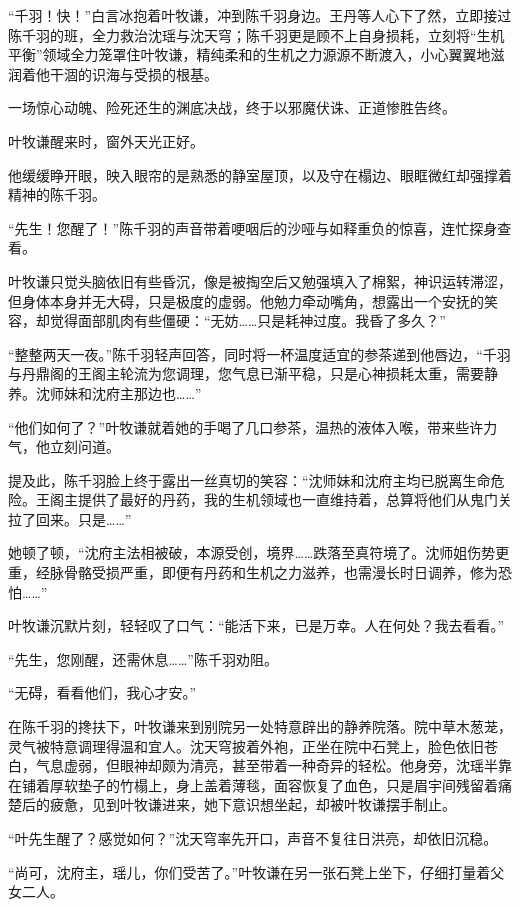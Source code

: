 “千羽！快！”白言冰抱着叶牧谦，冲到陈千羽身边。王丹等人心下了然，立即接过陈千羽的班，全力救治沈瑶与沈天穹；陈千羽更是顾不上自身损耗，立刻将“生机平衡”领域全力笼罩住叶牧谦，精纯柔和的生机之力源源不断渡入，小心翼翼地滋润着他干涸的识海与受损的根基。

一场惊心动魄、险死还生的渊底决战，终于以邪魔伏诛、正道惨胜告终。

\vspace{2em}

叶牧谦醒来时，窗外天光正好。

他缓缓睁开眼，映入眼帘的是熟悉的静室屋顶，以及守在榻边、眼眶微红却强撑着精神的陈千羽。

“先生！您醒了！”陈千羽的声音带着哽咽后的沙哑与如释重负的惊喜，连忙探身查看。

叶牧谦只觉头脑依旧有些昏沉，像是被掏空后又勉强填入了棉絮，神识运转滞涩，但身体本身并无大碍，只是极度的虚弱。他勉力牵动嘴角，想露出一个安抚的笑容，却觉得面部肌肉有些僵硬：“无妨……只是耗神过度。我昏了多久？”

“整整两天一夜。”陈千羽轻声回答，同时将一杯温度适宜的参茶递到他唇边，“千羽与丹鼎阁的王阁主轮流为您调理，您气息已渐平稳，只是心神损耗太重，需要静养。沈师妹和沈府主那边也……”

“他们如何了？”叶牧谦就着她的手喝了几口参茶，温热的液体入喉，带来些许力气，他立刻问道。

提及此，陈千羽脸上终于露出一丝真切的笑容：“沈师妹和沈府主均已脱离生命危险。王阁主提供了最好的丹药，我的生机领域也一直维持着，总算将他们从鬼门关拉了回来。只是……”

她顿了顿，“沈府主法相被破，本源受创，境界……跌落至真符境了。沈师姐伤势更重，经脉骨骼受损严重，即便有丹药和生机之力滋养，也需漫长时日调养，修为恐怕……”

叶牧谦沉默片刻，轻轻叹了口气：“能活下来，已是万幸。人在何处？我去看看。”

“先生，您刚醒，还需休息……”陈千羽劝阻。

“无碍，看看他们，我心才安。”

在陈千羽的搀扶下，叶牧谦来到别院另一处特意辟出的静养院落。院中草木葱茏，灵气被特意调理得温和宜人。沈天穹披着外袍，正坐在院中石凳上，脸色依旧苍白，气息虚弱，但眼神却颇为清亮，甚至带着一种奇异的轻松。他身旁，沈瑶半靠在铺着厚软垫子的竹榻上，身上盖着薄毯，面容恢复了血色，只是眉宇间残留着痛楚后的疲惫，见到叶牧谦进来，她下意识想坐起，却被叶牧谦摆手制止。

“叶先生醒了？感觉如何？”沈天穹率先开口，声音不复往日洪亮，却依旧沉稳。

“尚可，沈府主，瑶儿，你们受苦了。”叶牧谦在另一张石凳上坐下，仔细打量着父女二人。

